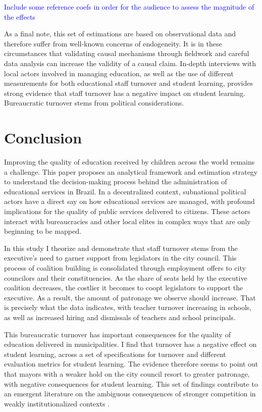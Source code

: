 \documentclass[12pt,a4paper]{article}
\newcommand{\blue}{\textcolor{blue}}
\begin{document}
\blue{Include some reference coefs in order for the audience to assess the magnitude of the effects}

As a final note, this set of estimations are based on observational data and therefore suffer from well-known concerns of endogeneity. It is in these circumstances that validating causal mechanisms through fieldwork and careful data analysis can increase the validity of a causal claim. In-depth interviews with local actors involved in managing education, as well as the use of different measurements for both educational staff turnover and student learning, provides strong evidence that staff turnover has a negative impact on student learning. Bureaucratic turnover stems from political considerations.



\section{Conclusion}

Improving the quality of education received by children across the world remains a challenge. This paper proposes an analytical framework and estimation strategy to understand the decision-making process behind the administration of educational services in Brazil. In a decentralized context, subnational political actors have a direct say on how educational services are managed, with profound implications for the quality of public services delivered to citizens. These actors interact with bureaucracies and other local elites in complex ways that are only beginning to be mapped.

In this study I theorize and demonstrate that staff turnover stems from the executive's need to garner support from legislators in the city council. This process of coalition building is consolidated through employment offers to city councilors and their constituencies. As the share of seats held by the executive coalition decreases, the costlier it becomes to coopt legislators to support the executive. As a result, the amount of patronage we observe should increase. That is precisely what the data indicates, with teacher turnover increasing in schools, as well as increased hiring and dismissals of teachers and school principals.

This bureaucratic turnover has important consequences for the quality of education delivered in municipalities. I find that turnover has a negative effect on student learning, across a set of specifications for turnover and different evaluation metrics for student learning. The evidence therefore seems to point out that mayors with a weaker hold on the city council resort to greater patronage, with negative consequences for student learning. This set of findings contribute to an emergent literature on the ambiguous consequences of stronger competition in weakly institutionalized contexts \citep{gottlieb_countervailing_2019}.
\end{document}
